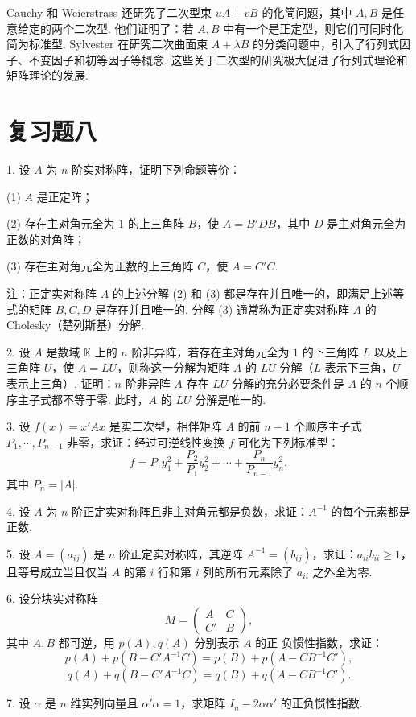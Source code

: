 \documentclass[UTF8,12pt,a4paper,fontset=fandol]{ctexart}
\begin{document}
Cauchy 和 Weierstrass 还研究了二次型束 $uA+vB$ 的化简问题，其中 $A,B$ 是任意给定的两个二次型. 他们证明了：若 $A,B$ 中有一个是正定型，则它们可同时化简为标准型. Sylvester 在研究二次曲面束 $A+\lambda B$ 的分类问题中，引入了行列式因子、不变因子和初等因子等概念. 这些关于二次型的研究极大促进了行列式理论和矩阵理论的发展.

\section*{复习题八}

1. 设 $A$ 为 $n$ 阶实对称阵，证明下列命题等价：

(1) $A$ 是正定阵；

(2) 存在主对角元全为 $1$ 的上三角阵 $B$，使 $A=B'DB$，其中 $D$ 是主对角元全为正数的对角阵；

(3) 存在主对角元全为正数的上三角阵 $C$，使 $A=C'C$.

注：正定实对称阵 $A$ 的上述分解 (2) 和 (3) 都是存在并且唯一的，即满足上述等式的矩阵 $B,C,D$ 是存在并且唯一的. 分解 (3) 通常称为正定实对称阵 $A$ 的 Cholesky（楚列斯基）分解.

2. 设 $A$ 是数域 $\mathbb K$ 上的 $n$ 阶非异阵，若存在主对角元全为 $1$ 的下三角阵 $L$ 以及上三角阵 $U$，使 $A=LU$，则称这一分解为矩阵 $A$ 的 $LU$ 分解（$L$ 表示下三角，$U$ 表示上三角）. 证明：$n$ 阶非异阵 $A$ 存在 $LU$ 分解的充分必要条件是 $A$ 的 $n$ 个顺序主子式都不等于零. 此时，$A$ 的 $LU$ 分解是唯一的.

3. 设 $f(x)=x'Ax$ 是实二次型，相伴矩阵 $A$ 的前 $n-1$ 个顺序主子式 $P_1,\cdots,P_{n-1}$ 非零，求证：经过可逆线性变换 $f$ 可化为下列标准型：
\[
f=P_1y_1^2+\frac{P_2}{P_1}y_2^2+\cdots+\frac{P_n}{P_{n-1}}y_n^2,
\]
其中 $P_n=|A|$.

4. 设 $A$ 为 $n$ 阶正定实对称阵且非主对角元都是负数，求证：$A^{-1}$ 的每个元素都是正数.

5. 设 $A=(a_{ij})$ 是 $n$ 阶正定实对称阵，其逆阵 $A^{-1}=(b_{ij})$，求证：$a_{ii}b_{ii}\geq 1$，且等号成立当且仅当 $A$ 的第 $i$ 行和第 $i$ 列的所有元素除了 $a_{ii}$ 之外全为零.

6. 设分块实对称阵
\[
M=\left(\begin{array}{cc}A&C\\ C'&B\end{array}\right),
\]
其中 $A,B$ 都可逆，用 $p(A),q(A)$ 分别表示 $A$ 的正
负惯性指数，求证：
\[
p(A)+p(B-C'A^{-1}C)=p(B)+p(A-CB^{-1}C'),
\]
\[
q(A)+q(B-C'A^{-1}C)=q(B)+q(A-CB^{-1}C').
\]

7. 设 $\alpha$ 是 $n$ 维实列向量且 $\alpha'\alpha=1$，求矩阵 $I_n-2\alpha\alpha'$ 的正负惯性指数.
\end{document}
